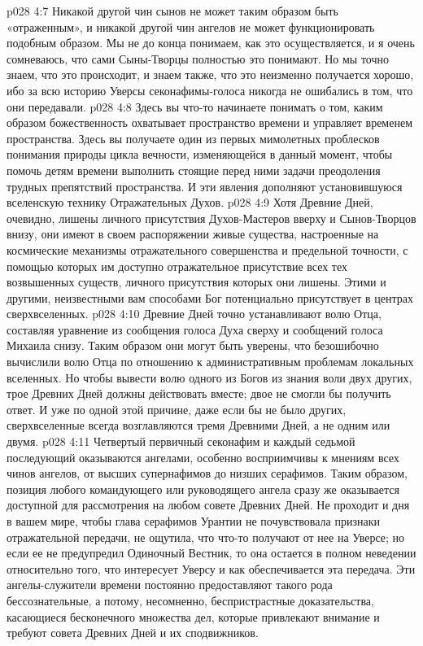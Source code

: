 \vs p028 4:7 Никакой другой чин сынов не может таким образом быть «отраженным», и никакой другой чин ангелов не может функционировать подобным образом. Мы не до конца понимаем, как это осуществляется, и я очень сомневаюсь, что сами Сыны\hyp{}Творцы полностью это понимают. Но мы точно знаем, что это происходит, и знаем также, что это неизменно получается хорошо, ибо за всю историю Уверсы секонафимы\hyp{}голоса никогда не ошибались в том, что они передавали.
\vs p028 4:8 Здесь вы что\hyp{}то начинаете понимать о том, каким образом божественность охватывает пространство времени и управляет временем пространства. Здесь вы получаете один из первых мимолетных проблесков понимания природы цикла вечности, изменяющейся в данный момент, чтобы помочь детям времени выполнить стоящие перед ними задачи преодоления трудных препятствий пространства. И эти явления дополняют установившуюся вселенскую технику Отражательных Духов.
\vs p028 4:9 Хотя Древние Дней, очевидно, лишены личного присутствия Духов\hyp{}Мастеров вверху и Сынов\hyp{}Творцов внизу, они имеют в своем распоряжении живые существа, настроенные на космические механизмы отражательного совершенства и предельной точности, с помощью которых им доступно отражательное присутствие всех тех возвышенных существ, личного присутствия которых они лишены. Этими и другими, неизвестными вам способами Бог потенциально присутствует в центрах сверхвселенных.
\vs p028 4:10 Древние Дней точно устанавливают волю Отца, составляя уравнение из сообщения голоса Духа сверху и сообщений голоса Михаила снизу. Таким образом они могут быть уверены, что безошибочно вычислили волю Отца по отношению к административным проблемам локальных вселенных. Но чтобы вывести волю одного из Богов из знания воли двух других, трое Древних Дней должны действовать вместе; двое не смогли бы получить ответ. И уже по одной этой причине, даже если бы не было других, сверхвселенные всегда возглавляются тремя Древними Дней, а не одним или двумя.
\vs p028 4:11 \pc {}\bibnobreakspace {} Четвертый первичный секонафим и каждый седьмой последующий оказываются ангелами, особенно восприимчивы к мнениям всех чинов ангелов, от высших супернафимов до низших серафимов. Таким образом, позиция любого командующего или руководящего ангела сразу же оказывается доступной для рассмотрения на любом совете Древних Дней. Не проходит и дня в вашем мире, чтобы глава серафимов Урантии не почувствовала признаки отражательной передачи, не ощутила, что что\hyp{}то получают от нее на Уверсе; но если ее не предупредил Одиночный Вестник, то она остается в полном неведении относительно того, что интересует Уверсу и как обеспечивается эта передача. Эти ангелы\hyp{}служители времени постоянно предоставляют такого рода бессознательные, а потому, несомненно, беспристрастные доказательства, касающиеся бесконечного множества дел, которые привлекают внимание и требуют совета Древних Дней и их сподвижников.
